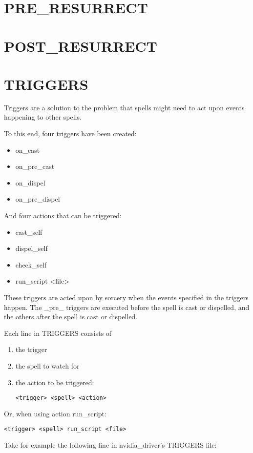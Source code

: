 \documentclass[a4paper,10pt]{book}
\begin{document}
\section{PRE\_RESURRECT}
\section{POST\_RESURRECT}
\section{TRIGGERS}
Triggers are a solution to the problem that spells might need to act upon
events happening to other spells.

To this end, four triggers have been created:
\begin{itemize}
\item on\_cast
\item on\_pre\_cast
\item on\_dispel
\item on\_pre\_dispel
\end{itemize}

And four actions that can be triggered:
\begin{itemize}
\item cast\_self
\item dispel\_self
\item check\_self
\item run\_script <file>
\end{itemize}

These triggers are acted upon by sorcery when the events specified in the
triggers happen. The \_pre\_ triggers are executed before the spell is cast or
dispelled, and the others after the spell is cast or dispelled.

Each line in TRIGGERS consists of
\begin{enumerate}
\item the trigger
\item the spell to watch for
\item the action to be triggered:
\begin{verbatim}
<trigger> <spell> <action>
\end{verbatim}
\end{enumerate}

Or, when using action run\_script:
\begin{verbatim}
<trigger> <spell> run_script <file>
\end{verbatim}

Take for example the following line in nvidia\_driver's TRIGGERS file:
\end{document}
